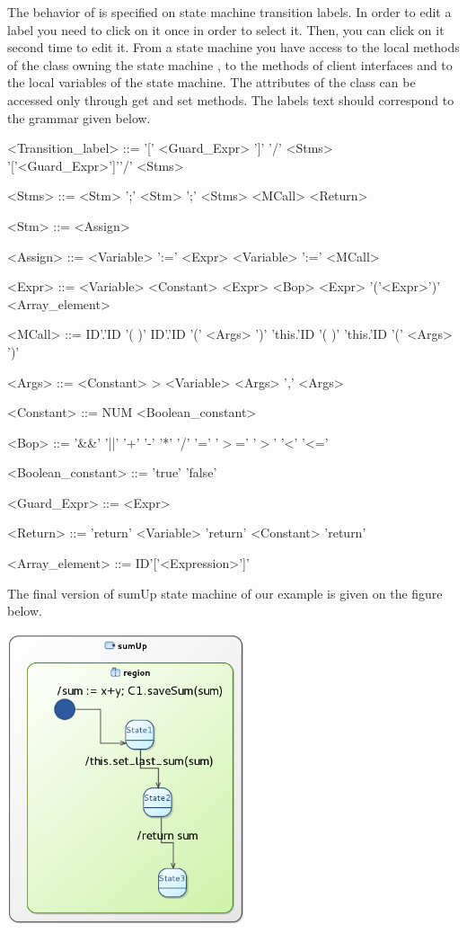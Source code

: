 \documentclass[12pt]{article}
\begin{document}
The behavior of is specified on state machine transition labels. In order to edit a label you need to click on it once in order to select it. Then, you can click on it second time to edit it. From a state machine you have access to the local methods of the class owning the state machine , to the methods of client interfaces and to the local variables of the state machine. The attributes of the class can be accessed only through get and set methods. The labels text should correspond to the grammar given below.

\begin{grammar}

<Transition_label> ::= '[' <Guard_Expr> ']' \alt '/' <Stms> \alt  '['<Guard_Expr>']'\alt '/' <Stms>

<Stms> ::= <Stm> ';' \alt <Stm> ';' <Stms> \alt <MCall> \alt <Return>

<Stm> ::= <Assign> 

<Assign> ::= <Variable> ':='  <Expr> \alt <Variable> ':=' <MCall>

<Expr> ::=  <Variable> \alt 
			<Constant> \alt  
			<Expr> <Bop> <Expr> \alt 
			'('<Expr>')' \alt
			<Array\_element>

<MCall> ::= ID'.'ID '( )' \alt 
	 ID'.'ID '(' <Args> ')' \alt 
	 'this.'ID '( )' \alt 
	'this.'ID  '(' <Args> ')'
	 
<Args> ::=  <Constant> \alt> <Variable> \alt <Args> ',' <Args>

<Constant> ::= NUM \alt <Boolean_constant>

<Bop> ::=  '\&\&' \alt  '||'  \alt '+' \alt '-' \alt '*' \alt '/' \alt '=' \alt '$>$=' \alt '$>$' \alt '\textless'  \alt '\textless='

<Boolean_constant> ::= 'true' \alt 'false'

<Guard_Expr> ::= <Expr>

<Return> ::= 'return' <Variable> \alt 'return' <Constant> \alt  'return'

<Array\_element> ::= ID'['<Expression>']'
\end{grammar}

The final version of sumUp state machine of our example is given on the figure below.

     \centerline{
     \includegraphics[width=7cm]{draws/sm.png}
     \label{fig:vce-proj}
     }
\end{document}
